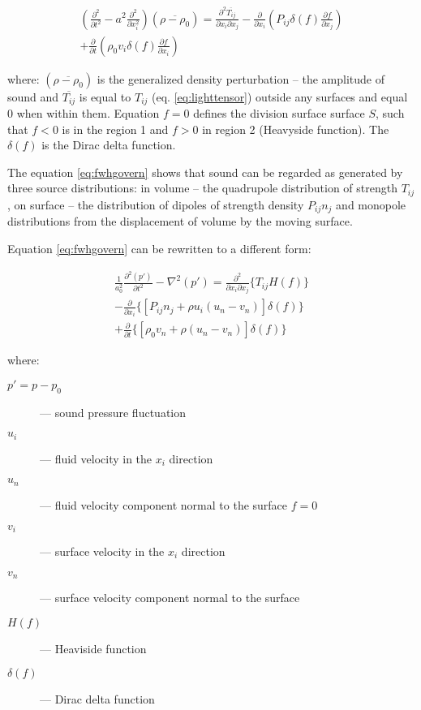 \begin{equation} \label{eq:fwhgovern}
\begin{split}
\left( \frac{\partial^2}{\partial t^2} - a^2 \frac{\partial^2}{\partial x_i^2} \right)
\left( \overline{\rho - \rho_0} \right)
=
\frac{\partial^2 \overline{T_{ij}}}{\partial x_i \partial x_j}
- \frac{\partial}{\partial x_i} \left( P_{ij} \delta(f) \frac{\partial f}{\partial x_j} \right) \\
+ \frac{\partial}{\partial t} \left( \rho_0 v_i \delta(f) \frac{\partial f}{\partial x_i} \right)
\end{split}
\end{equation}

\noindent where: $\left( \overline{\rho - \rho_0} \right)$ is the generalized density perturbation -- the amplitude of sound and $\overline{T_{ij}}$ is equal to $T_{ij}$ (eq. \ref{eq:lighttensor}) outside any surfaces and equal 0 when within them. Equation $f=0$ defines the division surface surface $S$, such that $f<0$ is in the region 1 and $f>0$ in region 2 (Heavyside function). The $\delta(f)$ is the Dirac delta function. 

The equation \ref{eq:fwhgovern} shows that sound can be regarded as generated by three source distributions: in volume -- the quadrupole distribution of strength $T_{ij}$, on surface -- the distribution of dipoles of strength density $P_{ij}n_j$ and monopole distributions from the displacement of volume by the moving surface.

Equation \ref{eq:fwhgovern} can be rewritten to a different form:

\begin{equation} \label{eq:fwhfluent}
\begin{split}
\frac{1}{a_0^2} \frac{\partial^2 \left(p'\right)}{\partial t^2}- \nabla^2  \left(p'\right)
= \frac{\partial^2}{\partial x_i \partial x_j} \lbrace T_{ij} H \left(f\right) \rbrace \\
- \frac{\partial}{\partial x_i} \lbrace \left[ P_{ij}n_j + \rho u_i \left( u_n - v_n \right) \right] \delta(f) \rbrace \\
+ \frac{\partial}{\partial t} \lbrace \left[ \rho_0 v_n + \rho \left( u_n - v_n \right) \right] \delta(f) \rbrace
\end{split}
\end{equation}

\noindent where:

\begin{description}
\item[$p' = p - p_0$] --- sound pressure fluctuation
\item[$u_i$] --- fluid velocity in the $x_i$ direction
\item[$u_n$] --- fluid velocity component normal to the surface $f = 0$
\item[$v_i$] --- surface velocity in the $x_i$ direction
\item[$v_n$] --- surface velocity component normal to the surface
\item[$H(f)$] --- Heaviside function
\item[$\delta(f)$] --- Dirac delta function
\end{description}

